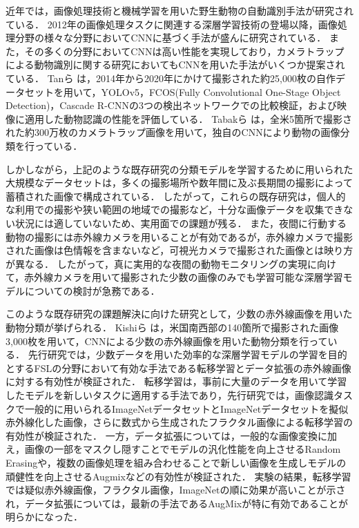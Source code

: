 \documentclass[a4paper,11pt,nomag]{jsreport}
\begin{document}
近年では，画像処理技術と機械学習を用いた野生動物の自動識別手法が研究されている．
2012年の画像処理タスクに関連する深層学習技術の登場以降，画像処理分野の様々な分野においてCNNに基づく手法が盛んに研究されている．
また，その多くの分野においてCNNは高い性能を実現しており，カメラトラップによる動物識別に関する研究においてもCNNを用いた手法がいくつか提案されている．
Tanら \cite{tan2022}は，2014年から2020年にかけて撮影された約25,000枚の自作データセットを用いて，YOLOv5，FCOS(Fully Convolutional One-Stage Object Detection)，Cascade R-CNNの3つの検出ネットワークでの比較検証，および映像に適用した動物認識の性能を評価している．
Tabakら \cite{tabak2019}は，全米5箇所で撮影された約300万枚のカメラトラップ画像を用いて，独自のCNNにより動物の画像分類を行っている．

しかしながら，上記のような既存研究の分類モデルを学習するために用いられた大規模なデータセットは，多くの撮影場所や数年間に及ぶ長期間の撮影によって蓄積された画像で構成されている．
したがって，これらの既存研究は，個人的な利用での撮影や狭い範囲の地域での撮影など，十分な画像データを収集できない状況には適していないため、実用面での課題が残る．
また，夜間に行動する動物の撮影には赤外線カメラを用いることが有効であるが，赤外線カメラで撮影された画像は色情報を含まないなど，可視光カメラで撮影された画像とは映り方が異なる．
したがって，真に実用的な夜間の動物モニタリングの実現に向けて，赤外線カメラを用いて撮影された少数の画像のみでも学習可能な深層学習モデルについての検討が急務である．

このような既存研究の課題解決に向けた研究として，少数の赤外線画像を用いた動物分類が挙げられる．
Kishiら \cite{kishimoto2023}は，米国南西部の140箇所で撮影された画像3,000枚を用いて，CNNによる少数の赤外線画像を用いた動物分類を行っている．
先行研究では，少数データを用いた効率的な深層学習モデルの学習を目的とするFSLの分野において有効な手法である転移学習とデータ拡張の赤外線画像に対する有効性が検証された．
転移学習は，事前に大量のデータを用いて学習したモデルを新しいタスクに適用する手法であり，先行研究では，画像認識タスクで一般的に用いられるImageNetデータセットとImageNetデータセットを擬似赤外線化した画像，さらに数式から生成されたフラクタル画像による転移学習の有効性が検証された．
一方，データ拡張については，一般的な画像変換に加え，画像の一部をマスクし隠すことでモデルの汎化性能を向上させるRandom Erasingや，複数の画像処理を組み合わせることで新しい画像を生成しモデルの頑健性を向上させるAugmixなどの有効性が検証された．
実験の結果，転移学習では疑似赤外線画像，フラクタル画像，ImageNetの順に効果が高いことが示され，データ拡張については，最新の手法であるAugMixが特に有効であることが明らかになった．
\end{document}
